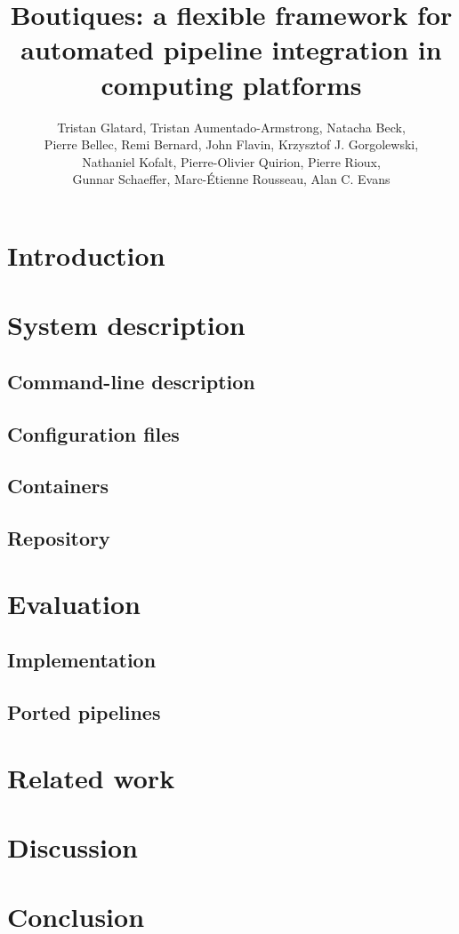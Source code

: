 \documentclass{article}
\title{Boutiques: a flexible framework for automated pipeline integration in computing platforms}
\begin{document}
\author{Tristan Glatard, Tristan Aumentado-Armstrong, Natacha Beck, \\
        Pierre Bellec, Remi Bernard, John Flavin, Krzysztof J. Gorgolewski, \\
        Nathaniel Kofalt, Pierre-Olivier Quirion, Pierre Rioux, \\
        Gunnar Schaeffer, Marc-\'Etienne Rousseau, Alan C. Evans}

\maketitle

\section{Introduction}

\section{System description}

\subsection{Command-line description}

\subsection{Configuration files}

\subsection{Containers}

\subsection{Repository}

\section{Evaluation}

\subsection{Implementation}

\subsection{Ported pipelines}


\section{Related work}


\section{Discussion}

\section{Conclusion}
\end{document}
